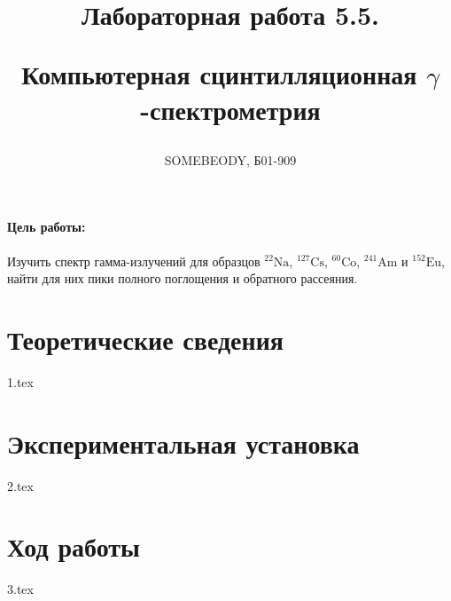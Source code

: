 \documentclass[a5paper, 10pt, twoside]{article} %
\title
{\hfill \break  \hfill \break
\hfill \break  \hfill \break
Лабораторная работа 5.5.

Компьютерная сцинтилляционная $\gamma$-спектрометрия}
\author{SOMEBEODY, Б01-909}
\begin{document}
\maketitle



\thispagestyle{empty} %

\newpage

\tableofcontents %
\thispagestyle{plain}
\newpage


\paragraph{Цель работы:}

Изучить спектр гамма-излучений для образцов ${}^{22}{\text{Na}}$,
${}^{127}{\text{Cs}}$, ${}^{60}{\text{Co}}$, ${}^{241}{\text{Am}}$ и
${}^{152}{\text{Eu}}$, найти для них пики полного поглощения и обратного
рассеяния.

\section{Теоретические сведения}
{1.tex}

\newpage
\section{Экспериментальная установка}
{2.tex}

\newpage
\section{Ход работы}
{3.tex}
\end{document}
